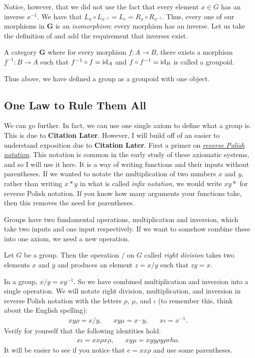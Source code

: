 \documentclass{article}
\begin{document}
Notice, however, that we did not use the fact that every element $x \in G$ has an inverse $x^{-1}$.
We have that $L_{x} \circ L_{x^{-1}} = L_{e} = R_{x} \circ R_{x^{-1}}$.
Thus, every one of our morphisms in $\textbf{G}$ is an \emph{isomorphism}: every morphism has an inverse.
Let us take the definition of  and add the requirement that inverses exist.
\begin{defn}\label{defn:groupoid}
  A category $\textbf{G}$ where for every morphism $f\colon A \to B$, there exists a morphism $f^{-1}\colon B \to A$ such that $f^{-1} \circ f = \operatorname{id}_{A}$ and $f \circ f^{-1} = \operatorname{id}_{B}$ is called a groupoid.
\end{defn}
Thus above, we have defined a group as a groupoid with one object.

\subsection*{One Law to Rule Them All}

We can go further.
In fact, we can use one single axiom to define what a group is.
This is due to \textbf{Citation Later}.
However, I will build off of an easier to understand exposition due to \textbf{Citation Later}.
First a primer on \href{https://en.wikipedia.org/wiki/Reverse_Polish_notation}{\emph{reverse Polish notation}}.
This notation is common in the early study of these axiomatic systems, and so I will use it here.
It is a way of writing functions and their inputs without parentheses.
If we wanted to notate the multiplication of two numbers $x$ and $y$, rather than writing $x * y$ in what is called \emph{infix notation}, we would write $x y *$ for reverse Polish notation.
If you know how many arguments your functions take, then this removes the need for parentheses.

Groups have two fundamental operations, multiplication and inversion, which take two inputs and one input respectively.
If we want to somehow combine these into one axiom, we need a new operation.
\begin{defn}\label{defn:rightdiv}
  Let $G$ be a group.
  Then the operation $/$ on $G$ called \emph{right division} takes two elements $x$ and $y$ and produces an element $z = x / y$ such that $zy = x$.
\end{defn}
In a group, $x / y = x y^{-1}$.
So we have combined multiplication and inversion into a single operation.
We will notate right division, multiplication, and inversion in reverse Polish notation with the letters $\rho$, $\mu$, and $\iota$ (to remember this, think about the English spelling):
\begin{align*}
  x y \rho = x / y, && x y \mu = x \cdot y, && x \iota = x^{-1}.
\end{align*}
Verify for yourself that the following identities hold.
\begin{align*}
  x \iota = x x \rho x \rho, && x y \mu = x y y \rho y \rho rho.
\end{align*}
It will be easier to see if you notice that $e = x x \rho$ and use some parentheses.
\end{document}
